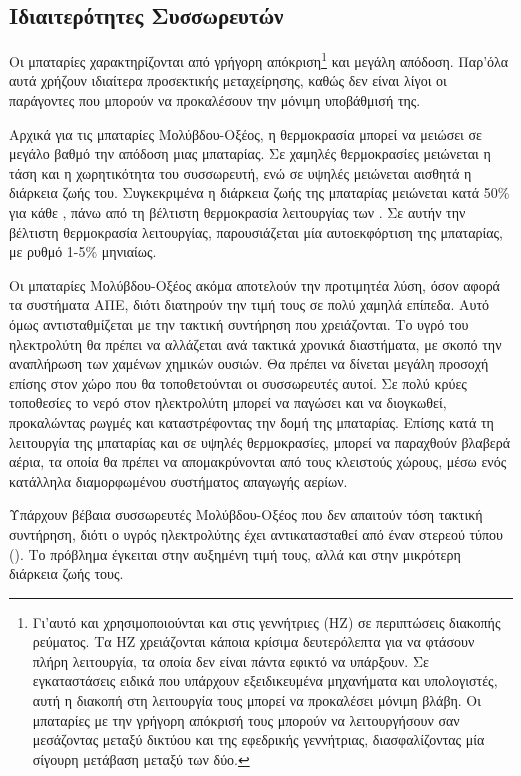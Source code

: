 \documentclass[12pt]{report}
\begin{document}
\subsection{Ιδιαιτερότητες Συσσωρευτών}
Οι μπαταρίες χαρακτηρίζονται από γρήγορη απόκριση\footnote{Γι'αυτό και χρησιμοποιούνται και στις γεννήτριες (ΗΖ) σε περιπτώσεις διακοπής ρεύματος. Τα ΗΖ χρειάζονται κάποια κρίσιμα δευτερόλεπτα για να φτάσουν πλήρη λειτουργία, τα
οποία δεν είναι πάντα εφικτό να υπάρξουν. Σε εγκαταστάσεις ειδικά που υπάρχουν εξειδικευμένα μηχανήματα και υπολογιστές, αυτή η διακοπή στη λειτουργία τους μπορεί να προκαλέσει μόνιμη βλάβη. Οι μπαταρίες με την γρήγορη
απόκρισή τους μπορούν να λειτουργήσουν σαν μεσάζοντας μεταξύ δικτύου και της εφεδρικής γεννήτριας, διασφαλίζοντας μία σίγουρη μετάβαση μεταξύ των δύο.} και μεγάλη απόδοση. Παρ'όλα αυτά χρήζουν ιδιαίτερα προσεκτικής μεταχείρησης, 
καθώς δεν είναι λίγοι οι παράγοντες που μπορούν να προκαλέσουν την μόνιμη υποβάθμισή της.

Αρχικά για τις μπαταρίες Μολύβδου-Οξέος, η θερμοκρασία μπορεί να μειώσει σε μεγάλο βαθμό την απόδοση μιας μπαταρίας. Σε χαμηλές θερμοκρασίες μειώνεται η τάση και η χωρητικότητα του συσσωρευτή, 
ενώ σε υψηλές μειώνεται αισθητά η διάρκεια ζωής του. Συγκεκριμένα 
η διάρκεια ζωής της μπαταρίας μειώνεται κατά 50\% για κάθε {}, πάνω από τη βέλτιστη θερμοκρασία λειτουργίας των {}. Σε αυτήν την βέλτιστη θερμοκρασία λειτουργίας, παρουσιάζεται
μία αυτοεκφόρτιση της μπαταρίας, με ρυθμό 1-5\% μηνιαίως.

Οι μπαταρίες Μολύβδου-Οξέος ακόμα αποτελούν την προτιμητέα λύση, όσον αφορά τα συστήματα ΑΠΕ, διότι διατηρούν την τιμή τους σε πολύ χαμηλά επίπεδα. Αυτό όμως αντισταθμίζεται με την τακτική συντήρηση που χρειάζονται. 
Το υγρό του ηλεκτρολύτη θα πρέπει να αλλάζεται ανά τακτικά χρονικά διαστήματα, με σκοπό την αναπλήρωση των χαμένων χημικών ουσιών. Θα πρέπει να δίνεται μεγάλη προσοχή επίσης στον χώρο που θα τοποθετούνται οι συσσωρευτές αυτοί.
Σε πολύ κρύες τοποθεσίες το νερό στον ηλεκτρολύτη μπορεί να παγώσει και να διογκωθεί, προκαλώντας ρωγμές και καταστρέφοντας την δομή της μπαταρίας. Επίσης κατά τη λειτουργία της μπαταρίας και σε υψηλές θερμοκρασίες, μπορεί να
παραχθούν βλαβερά αέρια, τα οποία θα πρέπει να απομακρύνονται από τους κλειστούς χώρους, μέσω ενός κατάλληλα διαμορφωμένου συστήματος απαγωγής αερίων.
 
Υπάρχουν βέβαια συσσωρευτές Μολύβδου-Οξέος που δεν απαιτούν τόση τακτική συντήρηση, διότι ο υγρός ηλεκτρολύτης έχει αντικατασταθεί από έναν στερεού τύπου ({}). Το πρόβλημα έγκειται στην αυξημένη τιμή τους, αλλά
και στην μικρότερη διάρκεια ζωής τους. 
\end{document}
